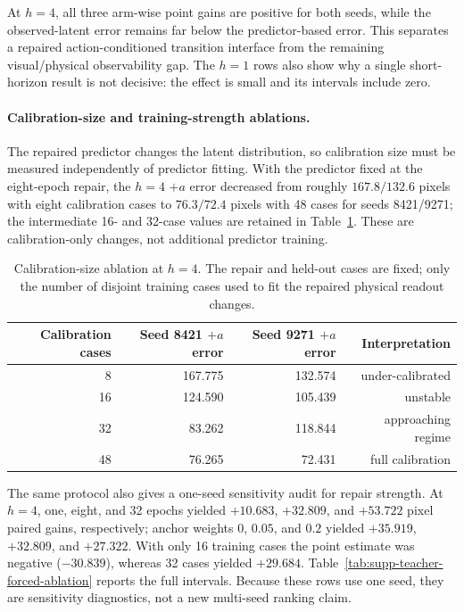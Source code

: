 \documentclass{article}
\begin{document}
At $h=4$, all three arm-wise point gains are positive for both seeds, while
the observed-latent error remains far below the predictor-based error. This
separates a repaired action-conditioned transition interface from the
remaining visual/physical observability gap. The $h=1$ rows also show why a
single short-horizon result is not decisive: the effect is small and its
intervals include zero.

\paragraph{Calibration-size and training-strength ablations.}
The repaired predictor changes the latent distribution, so calibration size
must be measured independently of predictor fitting. With the predictor fixed
at the eight-epoch repair, the $h=4$ $+a$ error decreased from roughly
$167.8/132.6$ pixels with eight calibration cases to $76.3/72.4$ pixels with
48 cases for seeds 8421/9271; the intermediate 16- and 32-case values are
retained in Table~\ref{tab:supp-teacher-forced-calibration}. These are
calibration-only changes, not additional predictor training.

\begin{table}[H]
\centering
\scriptsize
\caption{Calibration-size ablation at $h=4$. The repair and held-out cases
are fixed; only the number of disjoint training cases used to fit the
repaired physical readout changes.}
\label{tab:supp-teacher-forced-calibration}
\begin{tabular}{rrrr}
\toprule
Calibration cases & Seed 8421 $+a$ error & Seed 9271 $+a$ error & Interpretation \\
\midrule
8  & 167.775 & 132.574 & under-calibrated \\
16 & 124.590 & 105.439 & unstable \\
32 & 83.262  & 118.844 & approaching regime \\
48 & 76.265  & 72.431  & full calibration \\
\bottomrule
\end{tabular}
\end{table}

The same protocol also gives a one-seed sensitivity audit for repair strength.
At $h=4$, one, eight, and 32 epochs yielded $+10.683$, $+32.809$, and
$+53.722$ pixel paired gains, respectively; anchor weights $0$, $0.05$, and
$0.2$ yielded $+35.919$, $+32.809$, and $+27.322$. With only 16 training
cases the point estimate was negative ($-30.839$), whereas 32 cases yielded
$+29.684$. Table~\ref{tab:supp-teacher-forced-ablation} reports the full
intervals. Because these rows use one seed, they are sensitivity diagnostics,
not a new multi-seed ranking claim.
\end{document}
